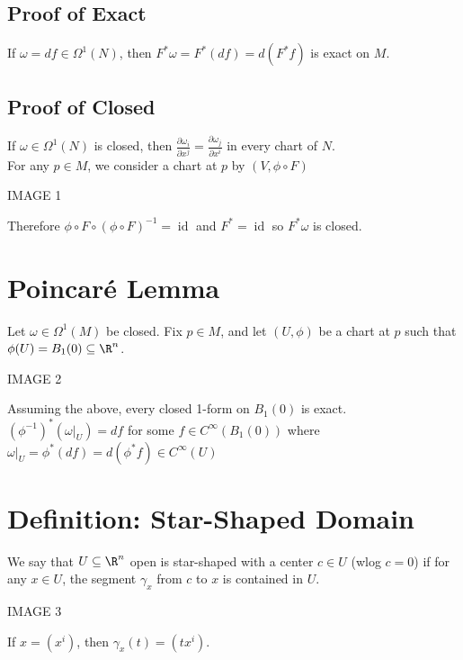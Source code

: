 \documentclass[11pt]{article}
\begin{document}
\subsection*{Proof of Exact}
\label{sec:orgdbaa90a}
If \(\omega=df\in\Omega^{1}(N)\), then \(F^{*}\omega=F^{*}(df)=d(F^{*}f)\) is exact on \(M\).\\
\subsection*{Proof of Closed}
\label{sec:org45988e9}
If \(\omega\in\Omega^{1}(N)\) is closed, then \(\frac{\partial\omega_{i}}{\partial x^{j}}=\frac{\partial \omega_{j}}{\partial x^{i}}\) in every chart of \(N\).\\
For any \(p\in M\), we consider a chart at \(p\) by \((V,\phi\circ F)\)\\
\begin{center}
IMAGE 1\\
\end{center}
Therefore \(\phi\circ F\circ(\phi\circ F)^{-1}=\operatorname{id}\) and \(F^{*}=\operatorname{id}\) so \(F^{*}\omega\) is closed.\\
\section*{Poincaré Lemma}
\label{sec:orgb60542d}
Let \(\omega\in\Omega^{1}(M)\) be closed. Fix \(p\in M\), and let \((U,\phi)\) be a chart at \(p\) such that \(\phi(U)=B_{1}(0)\subseteq\R^{n}\).\\
\begin{center}
IMAGE 2\\
\end{center}
Assuming the above, every closed 1-form on \(B_{1}(0)\) is exact. \((\phi^{-1})^{*}(\omega|_{U})=df\) for some \(f\in C^{\infty}(B_{1}(0))\) where \(\omega|_{U}=\phi^{*}(df)=d(\phi^{*}f)\in C^{\infty}(U)\)\\
\section*{Definition: Star-Shaped Domain}
\label{sec:org95b062f}
We say that \(U\subseteq\R^{n}\) open is star-shaped with a center \(c\in U\) (wlog \(c=0\)) if for any \(x\in U\), the segment \(\gamma_{x}\) from \(c\) to \(x\) is contained in \(U\).\\
\begin{center}
IMAGE 3\\
\end{center}
If \(x=(x^{i})\), then \(\gamma_{x}(t)=(tx^{i})\).\\
\end{document}
